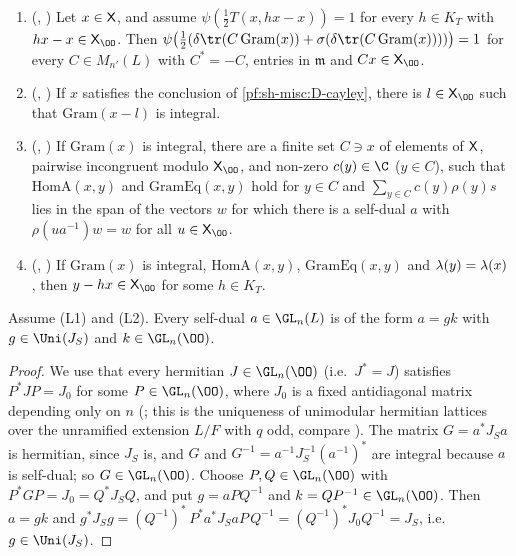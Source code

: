 \begin{enumerate}[label=(D\arabic*)]
\item\label{pf:sh-misc:D-cayley} (,
) Let $x\in\mathsf X$, and assume $\psi(\frac12T(x,hx-x))=1$ for every $h\in
K_T$ with $hx-x\in\shmiscXO$. Then $\psi\bigl(\frac12(\delta\tr(C\,\mathrm{Gram}(x))+\sigma(\delta\tr(C\,\mathrm{Gram}(x))))\bigr)=1$ for every
$C\in M_{n'}(L)$ with $C^*=-C$, entries in $\mathfrak m$ and $Cx\in\shmiscXO$.
\item\label{pf:sh-misc:D-phases} (,
) If $x$ satisfies the conclusion of \ref{pf:sh-misc:D-cayley}, there is
$l\in\shmiscXO$ such that $\mathrm{Gram}(x-l)$ is integral.
\item\label{pf:sh-misc:D-sum} (,
) If $\mathrm{Gram}(x)$ is integral, there are a finite set
$C\ni x$ of elements of $\mathsf X$, pairwise incongruent modulo $\shmiscXO$, and non-zero $c(y)\in\C$ ($y\in C$), such that $\mathrm{HomA}(x,y)$ and
$\mathrm{GramEq}(x,y)$ hold for $y\in C$ and $\sum_{y\in C}c(y)\rho(y)s$ lies in the span of the vectors $w$ for which there is a self-dual
$a$ with $\rho(ua^{-1})w=w$ for all $u\in\shmiscXO$.
\item\label{pf:sh-misc:D-witt} (,
) If $\mathrm{Gram}(x)$ is integral, $\mathrm{HomA}(x,y)$, $\mathrm{GramEq}(x,y)$
and $\lambda(y)=\lambda(x)$, then $y-hx\in\shmiscXO$ for some $h\in K_T$.
\end{enumerate}

\begin{lemma}\label{pf:sh-misc:selfdual}
Assume \textup{(L1)} and \textup{(L2)}. Every self-dual $a\in\GL_n(L)$ is of the form $a=gk$ with $g\in\Uni(J_S)$ and $k\in\GL_n(\OO)$.
\end{lemma}

\begin{proof}
We use that every hermitian $J\in\GL_n(\OO)$ (i.e.\ $J^*=J$) satisfies $P^*JP=J_0$ for some $P\in\GL_n(\OO)$, where $J_0$ is a fixed
antidiagonal matrix depending only on $n$ (; this is the uniqueness of unimodular hermitian lattices
over the unramified extension $L/F$ with $q$ odd, compare \cite{Jacobowitz1962}). The matrix $G=a^*J_Sa$ is hermitian, since $J_S$ is,
and $G$ and $G^{-1}=a^{-1}J_S^{-1}(a^{-1})^*$ are integral because $a$ is self-dual; so $G\in\GL_n(\OO)$. Choose $P,Q\in\GL_n(\OO)$ with
$P^*GP=J_0=Q^*J_SQ$, and put $g=aPQ^{-1}$ and $k=QP^{-1}\in\GL_n(\OO)$. Then $a=gk$ and
$g^*J_Sg=(Q^{-1})^*\,P^*a^*J_SaP\,Q^{-1}=(Q^{-1})^*J_0Q^{-1}=J_S$, i.e.\ $g\in\Uni(J_S)$.
\end{proof}

